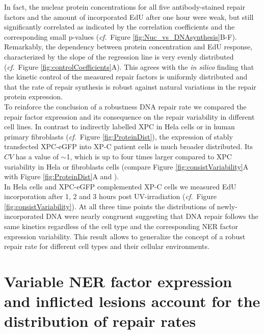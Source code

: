 \clearpage
In fact, the nuclear protein concentrations for all five antibody-stained repair factors and the amount of incorporated EdU after one hour were weak, but still significantly correlated as indicated by the correlation coefficients and the corresponding small p-values (\textit{cf.}\ Figure \ref{fig:Nuc_vs_DNAsynthesis}B-F). Remarkably, the dependency between protein concentration and EdU response, characterized by the slope of the regression line is very evenly distributed (\textit{cf.}\ Figure \ref{fig:controlCoefficients}A). This agrees with the \textit{in silico} finding that the kinetic control of the measured repair factors is uniformly distributed and that the rate of repair synthesis is robust against natural variations in the repair protein expression.\\ 
To reinforce the conclusion of a robustness DNA repair rate we compared the repair factor expression and its consequence on the repair variability in different cell lines. In contrast to indirectly labelled XPC in Hela cells \cite{Verbruggen2014} or in human primary fibroblasts (\textit{cf.}\ Figure \ref{fig:ProteinDist}), the expression of stably transfected XPC-eGFP into XP-C patient cells is much broader distributed. Its $CV$ has a value of $\sim$1, which is up to four times larger compared to XPC variability in Hela or fibroblasts cells (compare Figure \ref{fig:consistVariability}A with Figure \ref{fig:ProteinDist}A and \cite{Verbruggen2014}). \\
In Hela cells and XPC-eGFP complemented XP-C cells we measured EdU incorporation after 1, 2 and 3 hours post UV-irradiation (\textit{cf.}\ Figure \ref{fig:consistVariability}). At all three time points the distributions of newly-incorporated DNA were nearly congruent suggesting that DNA repair follows the same kinetics regardless of the cell type and the corresponding NER factor expression variability. This result allows to generalize the concept of a robust repair rate for different cell types and their cellular environments.\\ 






\section{Variable NER factor expression and inflicted lesions account for the distribution of repair rates} 
\label{sec:variabilityAnalysis}

